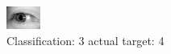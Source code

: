 \begin{figure}[h!]
\begin{center}
\includegraphics[width=0.60\columnwidth]{figures/ID3261_class_3_target_4.png}
\end{center}
\caption{ Classification: 3 actual target: 4}
\label{fig:ID3261_class_3_target_4}
\end{figure}
